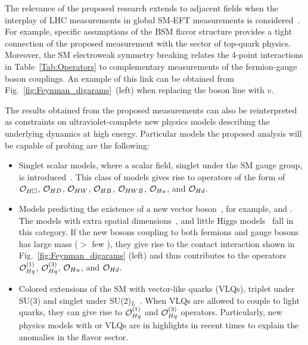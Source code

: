 \documentclass[a4paper,11pt]{article}
\begin{document}
The relevance of the proposed research extends to adjacent fields when the interplay of LHC measurements in global SM-EFT measurements is considered~\cite{Ellis:2018gqa,Ethier:2021bye}.
For example, specific assumptions of the BSM flavor structure provides a tight connection of the proposed measurement with the sector of top-quark physics. 
Moreover, the SM electroweak symmetry breaking relates the 4-point interactions in Table~\ref{Tab:Operators} to complementary measurements of the fermion-gauge boson couplings. 
An example of this link can be obtained from Fig.~\ref{fig:Feynman_digarams}~(left) when replacing the \PH boson line with $v$.

The results obtained from the proposed measurements can also be reinterpreted as constraints on ultraviolet-complete new physics models describing the underlying dynamics at high energy.
Particular models the proposed analysis will be capable of probing are the following:
\begin{itemize}

\item Singlet scalar models, where a scalar field, singlet under the SM gauge group, is introduced~\cite{deBlas:2014mba,Profumo:2014opa}. This class of models gives rise to operators of the form of ${\cal O}_{H\square}$, ${\cal O}_{HD}$, ${\cal O}_{HW}$, ${\cal O}_{HB}$, ${\cal O}_{HWB}$, ${\cal O}_{Hu}$, and ${\cal O}_{Hd}$.

\item Models predicting the existence of a new vector boson~\cite{delAguila:2010mx}, for example, \PZprime and \PWprime. 
The models with extra spatial dimensions~\cite{Burdman:2006gy}, and little Higgs models~\cite{PhysRevD.10.275} fall in this category.
If the new bosons coupling to both fermions and gauge bosons has large mass ($>$ few \TeV), they give rise to the contact interaction shown in Fig.~\ref{fig:Feynman_digarams} (left) and thus contributes to the operators  ${\cal O}^{(1)}_{Hq}$, ${\cal O}^{(3)}_{Hq}$, ${\cal O}_{Hu}$, and ${\cal O}_{Hd}$. 

\item Colored extensions of the SM with vector-like quarks (VLQs), triplet under SU(3) and singlet under SU(2)$_L$~\cite{delAguila:2000aa,Dawson:2012di}. 
When VLQs are allowed to couple to light quarks, they can give rise to ${\cal O}^{(1)}_{Hq}$ and ${\cal O}^{(3)}_{Hq}$ operators.
Particularly, new physics models with \PZprime or VLQs are in highlights in recent times to explain the anomalies in the flavor sector. 

\end{itemize}
\end{document}
